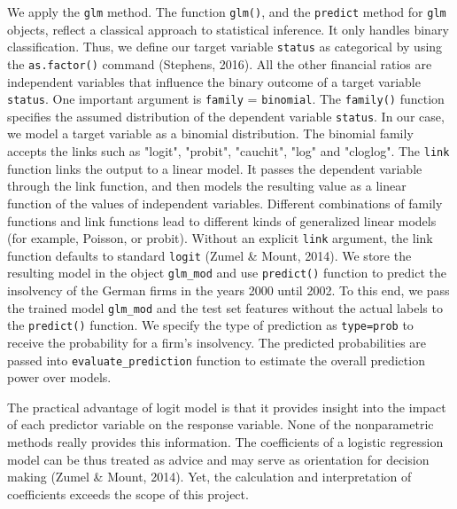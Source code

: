 \documentclass{article}
\begin{document}
We apply the \texttt{glm} method. The function \texttt{glm()}, and the \texttt{predict} method for \texttt{glm} objects, reflect a classical approach to statistical inference. It only handles binary classification. Thus, we define our target variable \texttt{status} as categorical by using the \texttt{as.factor()} command (Stephens, 2016). All the other financial ratios are independent variables that influence the binary outcome of a target variable \texttt{status}. One important argument is \texttt{family} = \texttt{binomial}. The \texttt{family()} function specifies the assumed distribution of the dependent variable \texttt{status}. In our case, we model a target variable as a binomial distribution. The binomial family accepts the links such as "logit", "probit", "cauchit", "log" and "cloglog". The \texttt{link} function links the output to a linear model. It passes the dependent variable through the link function, and then models the resulting value as a linear function of the values of independent variables. Different combinations of family functions and link functions lead to different kinds of generalized linear models (for example, Poisson, or probit). Without an explicit \texttt{link} argument, the link function defaults to standard \texttt{logit} (Zumel \& Mount, 2014). We store the resulting model in the object \texttt{glm\_mod} and use \texttt{predict()} function to predict the insolvency of the German firms in the years 2000 until 2002. To this end, we pass the trained model \texttt{glm\_mod} and the test set features without the actual labels to the \texttt{predict()} function. We specify the type of prediction as \texttt{type=prob} to receive the probability for a firm's insolvency. The predicted probabilities are passed into \texttt{evaluate\_prediction} function to estimate the overall prediction power over models.



The practical advantage of logit model is that it provides insight into the impact of each predictor variable on the response variable. None of the nonparametric methods really provides this information. The coefficients of a logistic regression model can be thus treated as advice and may serve as orientation for decision making (Zumel \& Mount, 2014). Yet, the calculation and interpretation of coefficients exceeds the scope of this project. 
\end{document}
